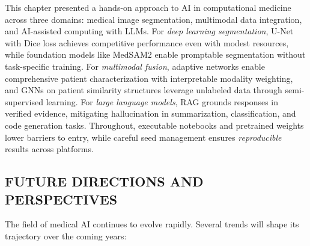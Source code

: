 \documentclass[krantz2,ChapterTOCs]{krantz}
\begin{document}
This chapter presented a hands-on approach to AI in computational medicine across three domains: medical image segmentation, multimodal data integration, and AI-assisted computing with LLMs.
For \emph{deep learning segmentation}, U-Net with Dice loss achieves competitive performance even with modest resources, while foundation models like MedSAM2 enable promptable segmentation without task-specific training.
For \emph{multimodal fusion}, adaptive networks enable comprehensive patient characterization with interpretable modality weighting, and GNNs on patient similarity structures leverage unlabeled data through semi-supervised learning.
For \emph{large language models}, RAG grounds responses in verified evidence, mitigating hallucination in summarization, classification, and code generation tasks.
Throughout, executable notebooks and pretrained weights lower barriers to entry, while careful seed management ensures \emph{reproducible} results across platforms.

\subsection{FUTURE DIRECTIONS AND PERSPECTIVES}

The field of medical AI continues to evolve rapidly. Several trends will shape its trajectory over the coming years:
\end{document}
